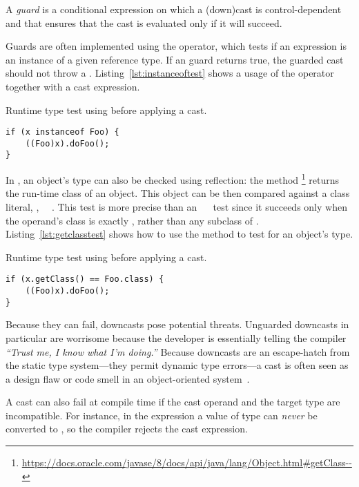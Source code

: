 A \emph{guard} is a conditional expression
on which a (down)cast is control-dependent and that ensures that the cast
is evaluated only if it will succeed.

Guards are often implemented using the  operator, which tests
if an expression is an instance of a given reference type.
If an  guard returns true, the guarded cast should not throw
a .
Listing~\ref{lst:instanceoftest} shows a usage of the  operator together with a cast expression.

\begin{listing}
\caption{Runtime type test using  before applying a cast.}
\label{lst:instanceoftest}
\begin{verbatim}
if (x instanceof Foo) {
	((Foo)x).doFoo();
}
\end{verbatim}
\end{listing}

In \java{}, an object's type can also be checked using reflection:
the  method%
\footnote{\url{https://docs.oracle.com/javase/8/docs/api/java/lang/Object.html\#getClass--}}
returns the run-time class of an object.
This  object can be then compared against a class literal, \eg,
~\code{==}~.
This test is more precise than an ~~ test since it succeeds only when the operand's class is exactly ,
rather than any subclass of .
Listing~\ref{lst:getclasstest} shows how to use the  method to test for an object's type.

\begin{listing}
\caption{Runtime type test using  before applying a cast.}
\label{lst:getclasstest}
\begin{verbatim}
if (x.getClass() == Foo.class) {
	((Foo)x).doFoo(); 
}
\end{verbatim}
\end{listing}

Because they can fail,
downcasts pose potential threats.
Unguarded downcasts in particular are
worrisome because the developer is essentially telling the compiler
\emph{``Trust me, I know what I'm doing.''}
Because downcasts are an escape-hatch from the static type system---they
permit dynamic type errors---a cast is often seen as a design flaw or code
smell in an object-oriented system~\citep{tufanoWhenWhyYour2015}.

A cast can also fail at compile time if the cast operand and the target type are incompatible.
For instance, in the expression  a value of type
 can \emph{never} be converted to , so the compiler
rejects the cast expression.


